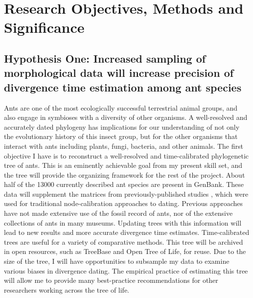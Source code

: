 \documentclass[]{article}
\begin{document}
\section*{Research Objectives, Methods and Significance}
\subsection*{Hypothesis One: Increased sampling of morphological data will increase precision of divergence time estimation among ant species}

Ants are one of the most ecologically successful terrestrial animal groups, and also engage in symbioses with a diversity of other organisms. A well-resolved and accurately dated phylogeny has implications for our understanding of not only the evolutionary history of this insect group, but for the other organisms that interact with ants including plants, fungi, bacteria, and other animals. The first objective I have is to reconstruct a well-resolved and time-calibrated phylogenetic tree of ants. This is an eminently achievable goal from my present skill set, and the tree will provide the organizing framework for the rest of the project. About half of the 13000 currently described ant species are present in GenBank. These data will supplement the matrices from previously-published studies \citep{brady2006evaluating, moreau2006phylogeny, moreau2013testing}, which were used for traditional node-calibration approaches to dating. Previous approaches have not made extensive use of the fossil record of ants, nor of the extensive collections of ants in many museums. Updating trees with this information will lead to new results and more accurate divergence time estimates. Time-calibrated trees are useful for a variety of comparative methods. This tree will be archived in open resources, such as TreeBase and Open Tree of Life, for reuse. Due to the size of the tree, I will have opportunities to subsample my data to examine various biases in divergence dating. The empirical practice of estimating this tree will allow me to provide many best-practice recommendations for other researchers working across the tree of life.\par
\end{document}
